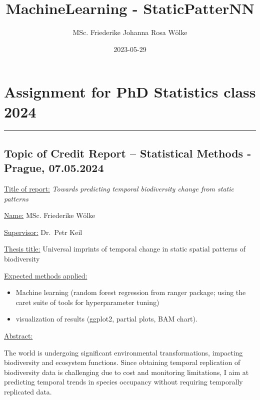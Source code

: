 \documentclass[
  letterpaper,
  DIV=11,
  numbers=noendperiod]{scrartcl}
\title{MachineLearning - StaticPatterNN}
\author{MSc. Friederike Johanna Rosa Wölke}
\date{2023-05-29}
\providecommand{\tightlist}{%
  \setlength{\itemsep}{0pt}\setlength{\parskip}{0pt}}\usepackage{longtable,booktabs,array}
\renewcommand*\contentsname{Table of contents}
\newcommand\contentsname{Table of contents}
\begin{document}
\maketitle

\renewcommand*\contentsname{Table of contents}
{
\hypersetup{linkcolor=}
\setcounter{tocdepth}{3}
\tableofcontents
}
\section{Assignment for PhD Statistics class
2024}\label{assignment-for-phd-statistics-class-2024}

\begin{center}\rule{0.5\linewidth}{0.5pt}\end{center}

\subsection{\texorpdfstring{\textbf{Topic of Credit Report --
Statistical Methods} - Prague,
07.05.2024}{Topic of Credit Report -- Statistical Methods - Prague, 07.05.2024}}\label{topic-of-credit-report-statistical-methods---prague-07.05.2024}

\ul{Title of report:} \emph{Towards predicting temporal biodiversity
change from static patterns}

\ul{Name:} MSc. Friederike Wölke

\ul{Supervisor:} Dr.~Petr Keil

\ul{Thesis title:} Universal imprints of temporal change in static
spatial patterns of biodiversity

\ul{Expected methods applied:}

\begin{itemize}
\tightlist
\item
  Machine learning {(random forest regression from ranger package; using
  the caret suite of tools for hyperparameter tuning)}
\item
  visualization of results (ggplot2, partial plots, BAM chart).
\end{itemize}

\ul{Abstract:}

The world is undergoing significant environmental transformations,
impacting biodiversity and ecosystem functions. Since obtaining temporal
replication of biodiversity data is challenging due to cost and
monitoring limitations, I aim at predicting temporal trends in species
occupancy without requiring temporally replicated data.
\end{document}
